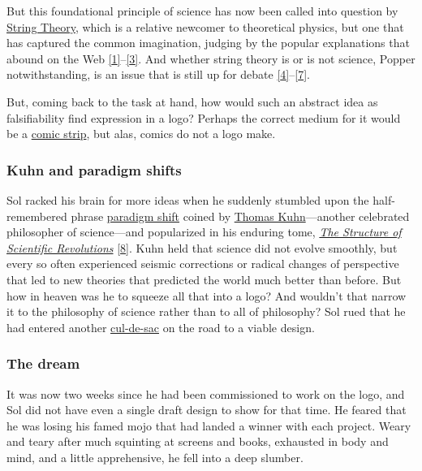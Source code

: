 \documentclass[
  a4paper,
]{article}
\begin{document}
But this foundational principle of science has now been called into
question by
\href{https://www.britannica.com/science/string-theory}{String Theory},
which is a relative newcomer to theoretical physics, but one that has
captured the common imagination, judging by the popular explanations
that abound on the Web
\protect\hyperlink{ref-mann2019}{{[}1{]}}--\protect\hyperlink{ref-jones2020}{{[}3{]}}.
And whether string theory is or is not science, Popper notwithstanding,
is an issue that is still up for debate
\protect\hyperlink{ref-siegel2015}{{[}4{]}}--\protect\hyperlink{ref-francis2019}{{[}7{]}}.

But, coming back to the task at hand, how would such an abstract idea as
falsifiability find expression in a logo? Perhaps the correct medium for
it would be a
\href{https://www.explainxkcd.com/wiki/index.php/2078:_Popper}{comic
strip}, but alas, comics do not a logo make.

\hypertarget{kuhn-and-paradigm-shifts}{%
\subsubsection{Kuhn and paradigm
shifts}\label{kuhn-and-paradigm-shifts}}

Sol racked his brain for more ideas when he suddenly stumbled upon the
half-remembered phrase
\href{https://www.lexico.com/definition/paradigm_shift}{paradigm shift}
coined by \href{https://en.wikipedia.org/wiki/Thomas_Kuhn}{Thomas
Kuhn}---another celebrated philosopher of science---and popularized in
his enduring tome,
\href{https://www.amazon.com/Structure-Scientific-Revolutions-50th-Anniversary/dp/0226458121/}{\emph{The
Structure of Scientific Revolutions}}
\protect\hyperlink{ref-kuhn2012}{{[}8{]}}. Kuhn held that science did
not evolve smoothly, but every so often experienced seismic corrections
or radical changes of perspective that led to new theories that
predicted the world much better than before. But how in heaven was he to
squeeze all that into a logo? And wouldn't that narrow it to the
philosophy of science rather than to all of philosophy? Sol rued that he
had entered another
\href{https://www.merriam-webster.com/dictionary/cul-de-sac}{cul-de-sac}
on the road to a viable design.

\hypertarget{the-dream}{%
\subsubsection{The dream}\label{the-dream}}

It was now two weeks since he had been commissioned to work on the logo,
and Sol did not have even a single draft design to show for that time.
He feared that he was losing his famed mojo that had landed a winner
with each project. Weary and teary after much squinting at screens and
books, exhausted in body and mind, and a little apprehensive, he fell
into a deep slumber.
\end{document}
